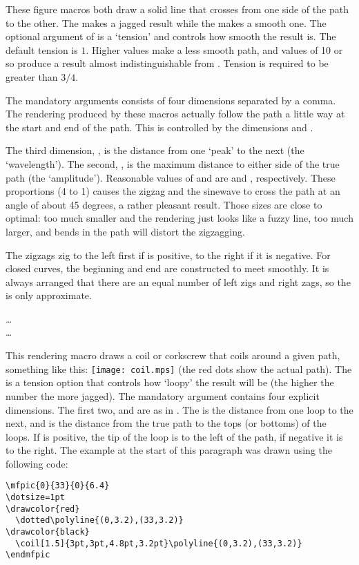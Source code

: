 \documentclass[letterpaper]{article}
\begin{document}
These figure macros both draw a solid line that crosses from one
side of the path to the other. The  makes a jagged result
while the  makes a smooth one. The optional argument of
 is a `tension' and controls how smooth the result is. The
default tension is $1$. Higher values make a less smooth path, and
values of 10 or so produce a result almost indistinguishable from
. Tension is required to be greater than $3/4$.

The mandatory arguments consists of four dimensions separated by a comma.
The rendering produced by these macros actually follow the path a little
way at the start and end of the path. This is controlled by the
dimensions  and .

The third dimension, , is the distance from one `peak' to the
next (the `wavelength'). The second, , is the maximum distance
to either side of the true path (the `amplitude'). Reasonable values of
 and  are \dim{8pt} and \dim{2pt}, respectively.
These proportions (4 to 1) causes the zigzag and the sinewave to cross
the path at an angle of about 45 degrees, a rather pleasant result.
Those sizes are close to optimal: too much smaller and the rendering
just looks like a fuzzy line, too much larger, and bends in the path
will distort the zigzagging.

The zigzags zig to the left first if  is positive, to the
right if it is negative. For closed curves, the beginning and end are
constructed to meet smoothly. It is always arranged that there are an
equal number of left zigs and right zags, so the  is only
approximate.


\begin{cd}
%
    \dots\\%
%
    \dots%
%
\end{cd}

This rendering macro draws a coil or corkscrew that coils around a
given path, something like this: \texttt{[image: coil.mps]} (the red
dots show the actual path). The  is a tension option that
controls how `loopy' the result will be (the higher the number the more
jagged). The mandatory argument contains four explicit dimensions. The
first two,  and  are as in . The
 is the distance from one loop to the next, and  is
the distance from the true path to the tops (or bottoms) of the
loops. If  is positive, the tip of the loop is to the left
of the path, if negative it is to the right. The example at the start of
this paragraph was drawn using the following code:
\begin{verbatim}
\mfpic{0}{33}{0}{6.4}
\dotsize=1pt
\drawcolor{red}
  \dotted\polyline{(0,3.2),(33,3.2)}
\drawcolor{black}
  \coil[1.5]{3pt,3pt,4.8pt,3.2pt}\polyline{(0,3.2),(33,3.2)}
\endmfpic
\end{verbatim}
\end{document}
